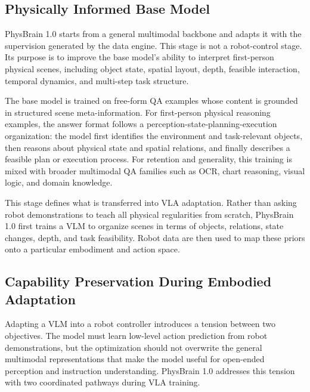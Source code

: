 \documentclass{llmxive}
\begin{document}

\subsection{Physically Informed Base Model}

PhysBrain 1.0 starts from a general multimodal backbone and adapts it with the supervision generated by the data engine. This stage is not a robot-control stage. Its purpose is to improve the base model's ability to interpret first-person physical scenes, including object state, spatial layout, depth, feasible interaction, temporal dynamics, and multi-step task structure.

The base model is trained on free-form QA examples whose content is grounded in structured scene meta-information. For first-person physical reasoning examples, the answer format follows a perception-state-planning-execution organization: the model first identifies the environment and task-relevant objects, then reasons about physical state and spatial relations, and finally describes a feasible plan or execution process. For retention and generality, this training is mixed with broader multimodal QA families such as OCR, chart reasoning, visual logic, and domain knowledge.

This stage defines what is transferred into VLA adaptation. Rather than asking robot demonstrations to teach all physical regularities from scratch, PhysBrain 1.0 first trains a VLM to organize scenes in terms of objects, relations, state changes, depth, and task feasibility. Robot data are then used to map these priors onto a particular embodiment and action space.

\subsection{Capability Preservation During Embodied Adaptation}

Adapting a VLM into a robot controller introduces a tension between two objectives. The model must learn low-level action prediction from robot demonstrations, but the optimization should not overwrite the general multimodal representations that make the model useful for open-ended perception and instruction understanding. PhysBrain 1.0 addresses this tension with two coordinated pathways during VLA training.
\end{document}
